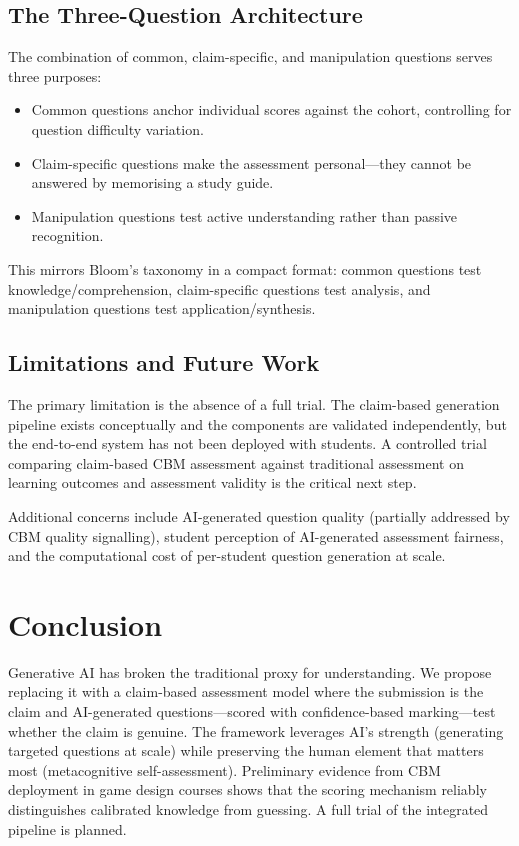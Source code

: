 \documentclass[sigconf]{acmart}
\begin{document}
\subsection{The Three-Question Architecture}

The combination of common, claim-specific, and manipulation questions serves three purposes:
\begin{itemize}
    \item Common questions anchor individual scores against the cohort, controlling for question difficulty variation.
    \item Claim-specific questions make the assessment personal---they cannot be answered by memorising a study guide.
    \item Manipulation questions test active understanding rather than passive recognition.
\end{itemize}

This mirrors Bloom's taxonomy in a compact format: common questions test knowledge/comprehension, claim-specific questions test analysis, and manipulation questions test application/synthesis.

\subsection{Limitations and Future Work}

The primary limitation is the absence of a full trial. The claim-based generation pipeline exists conceptually and the components are validated independently, but the end-to-end system has not been deployed with students. A controlled trial comparing claim-based CBM assessment against traditional assessment on learning outcomes and assessment validity is the critical next step.

Additional concerns include AI-generated question quality (partially addressed by CBM quality signalling), student perception of AI-generated assessment fairness, and the computational cost of per-student question generation at scale.

\section{Conclusion}

Generative AI has broken the traditional proxy for understanding. We propose replacing it with a claim-based assessment model where the submission is the claim and AI-generated questions---scored with confidence-based marking---test whether the claim is genuine. The framework leverages AI's strength (generating targeted questions at scale) while preserving the human element that matters most (metacognitive self-assessment). Preliminary evidence from CBM deployment in game design courses shows that the scoring mechanism reliably distinguishes calibrated knowledge from guessing. A full trial of the integrated pipeline is planned.



\end{document}
